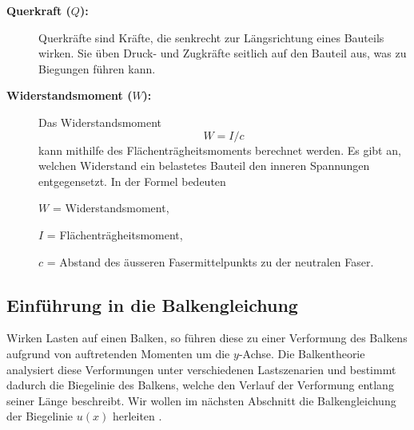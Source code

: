 \begin{description}
\item[\textbf{Querkraft ($Q$):}] Querkräfte sind Kräfte, die senkrecht zur Längsrichtung eines Bauteils wirken.
%
Sie üben Druck- und Zugkräfte seitlich auf den Bauteil aus, was zu Biegungen führen kann.

\item[\textbf{Widerstandsmoment ($W$):}] Das Widerstandsmoment
%
\begin{equation}
W=I/c
\end{equation}
kann mithilfe des Flächenträgheitsmoments berechnet werden.
Es gibt an, welchen Widerstand ein belastetes Bauteil den inneren Spannungen entgegensetzt. In der Formel bedeuten

$W$ = Widerstandsmoment,

$I$ = Flächenträgheitsmoment,

$c$ = Abstand des äusseren Fasermittelpunkts zu der neutralen Faser.
\end{description}

\subsection{Einführung in die Balkengleichung}
Wirken Lasten auf einen Balken, so führen diese zu einer Verformung des Balkens aufgrund von auftretenden Momenten um die $y$-Achse.
Die Balkentheorie analysiert diese Verformungen unter verschiedenen Lastszenarien und bestimmt dadurch die Biegelinie des Balkens, welche den Verlauf der Verformung entlang seiner Länge beschreibt.
Wir wollen im nächsten Abschnitt die Balkengleichung der Biegelinie $u(x)$ herleiten \cite{balken:Balkentheorie}.

